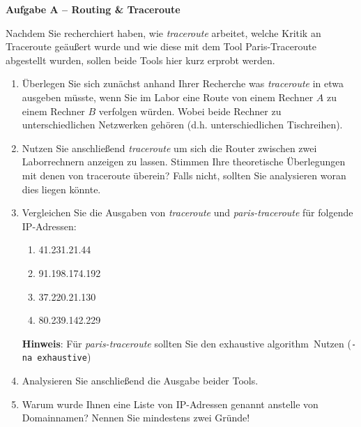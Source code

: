 \documentclass[paper=a4,fontsize=11pt]{scrartcl}%
\numberwithin{equation}{section}
\begin{document}
\begin{center}\Large{\textbf{Aufgabe A -- Routing \& Traceroute}}\end{center}\vskip0.25in
Nachdem Sie recherchiert haben, wie \emph{traceroute} arbeitet, welche Kritik an Traceroute geäußert wurde und wie diese mit dem Tool Paris-Traceroute abgestellt wurden, sollen beide Tools hier kurz erprobt werden.
\begin{enumerate}
	\item Überlegen Sie sich zunächst anhand Ihrer Recherche was \emph{traceroute} in etwa ausgeben müsste, wenn Sie im Labor eine Route von einem Rechner $A$ zu einem Rechner $B$ verfolgen würden. Wobei beide Rechner zu unterschiedlichen Netzwerken gehören (d.h. unterschiedlichen Tischreihen). 
	\item Nutzen Sie anschließend \emph{traceroute} um sich die Router zwischen zwei Laborrechnern anzeigen zu lassen. Stimmen Ihre theoretische Überlegungen mit denen von traceroute überein? Falls nicht, sollten Sie analysieren woran dies liegen könnte.
	\item Vergleichen Sie die Ausgaben von \emph{traceroute} und \emph{paris-traceroute} für folgende IP-Adressen:
	\begin{enumerate}
		\item 41.231.21.44
		\item 91.198.174.192
		\item 37.220.21.130
		\item 80.239.142.229
	\end{enumerate}
	\textbf{Hinweis}: Für \emph{paris-traceroute} sollten Sie den \glqq exhaustive algorithm\grqq\ Nutzen (\texttt{-na exhaustive})
	\item Analysieren Sie anschließend die Ausgabe beider Tools.
	\item Warum wurde Ihnen eine Liste von IP-Adressen genannt anstelle von Domainnamen? Nennen Sie mindestens zwei Gründe!
\end{enumerate}
\end{document}
